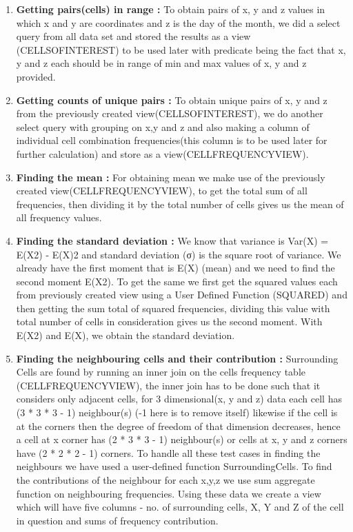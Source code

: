 \begin{enumerate}
    \item \textbf{Getting pairs(cells) in range :} To obtain pairs of x, y and z values in which x and y are coordinates and z is the day of the month, we did a select query from all data set and stored the results as a view (CELLSOFINTEREST) to be used later  with predicate being the fact that x, y and z each should be in range of min and max values of x, y and z provided.
    \item \textbf{Getting counts of unique pairs :} To obtain unique pairs of x, y and z from the previously created view(CELLSOFINTEREST), we do another select query with grouping on x,y and z and also making a column of individual cell combination frequencies(this column is to be used later for further calculation) and store as a view(CELLFREQUENCYVIEW).
    \item \textbf{Finding the mean :} For obtaining mean we make use of the previously created view(CELLFREQUENCYVIEW), to get the total sum of all frequencies, then dividing it by the total number of cells gives us the mean of all frequency values.
    \item \textbf{Finding the standard deviation :} We know that variance is  Var(X) = E(X2) - E(X)2 and standard deviation (σ) is the square root of variance. We already have the first moment that is E(X) (mean) and we need to find the second moment E(X2). To get the same we first get the squared values each from previously created view using a User Defined Function (SQUARED) and then getting the sum total of squared frequencies, dividing this value with total number of cells in consideration gives us the second moment. With E(X2) and E(X), we obtain the standard deviation.
    \item \textbf{Finding the neighbouring cells and their contribution :} Surrounding Cells are found by running an inner join on the cells frequency table (CELLFREQUENCYVIEW), the inner join has to be done such that it considers only adjacent cells, for 3 dimensional(x, y and z) data each cell has (3 * 3 * 3 - 1) neighbour(s) (-1 here is to remove itself)  likewise if the cell is at the corners then the degree of freedom of that dimension decreases, hence a cell at x corner has (2 * 3 * 3 - 1) neighbour(s) or cells at x, y and z corners have (2 * 2 * 2 - 1) corners. To handle all these test cases in finding the neighbours we have used a user-defined function SurroundingCells. To find the contributions of the neighbour for each x,y,z we use sum aggregate function on neighbouring frequencies. Using these data we create a view which will have five columns -  no. of surrounding cells, X, Y and Z of the cell in question and sums of frequency contribution.

\end{enumerate}
